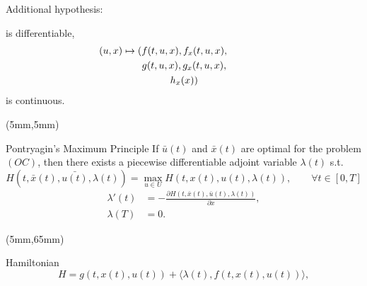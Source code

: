 \begin{frame}[plain]
\begin{textblock*}{60mm}
\begin{graybox}{Additional hypothesis:}
\begin{enumerate}[(\textbf{{C}}-4)]
                is differentiable,
                \\
                \begin{multline*}
                    \hspace*{-15mm}
                    (u,x) 
                    \mapsto 
                    (f(t,u,x),f_x(t,u,x),
                    \\
                    g(t,u,x),g_x(t,u,x),
                    \\
                    h_x(x))
                \end{multline*}
                is continuous.
            \end{enumerate}
        \end{graybox}
    \end{textblock*}
\end{frame}
\begin{frame}[plain]
    \begin{textblock*}{120mm}(5mm,5mm)
        \begin{graybox}{Pontryagin’s Maximum Principle}
            If $\bar{u}(t)$ and $\bar{x}(t)$ are optimal for the problem 
            $(OC)$, then there exists a piecewise differentiable adjoint 
            variable $\lambda(t)$ s.t.
            \begin{equation*}
                H(t,\bar{x}(t), \bar{u(t)}, \lambda(t))
                =
                \max_{u \in U} H(t, x(t), u(t), \lambda(t)),
                \qquad \forall t \in [0, T]
            \end{equation*}
%
            \begin{align*}
                    \lambda'(t) &= -\frac{\partial 
                    H(t,\bar{x}(t),\bar{u}(t),\lambda(t))}{\partial x},\\
                \lambda(T) &= 0.
            \end{align*}
        \end{graybox}
    \end{textblock*}
    \begin{textblock*}{75mm}(5mm,65mm)
        \begin{yellowbox}{Hamiltonian}
            \begin{equation*}
                H=g(t,x(t),u(t))+\langle \lambda(t),f(t,x(t),u(t))\rangle,
            \end{equation*}
        \end{yellowbox}
    \end{textblock*}
\end{frame}
